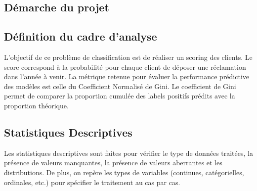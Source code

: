 \documentclass[french]{article}
\begin{document}
\begin{multicols}{2}
\section{Démarche du projet}

\subsection{Définition du cadre d'analyse}

L'objectif de ce problème de classification est de réaliser un scoring des clients. Le score correspond à la probabilité pour chaque client de déposer une réclamation dans l'année à venir. La métrique retenue pour évaluer la performance prédictive des modèles est celle du Coefficient Normalisé de Gini. Le coefficient de Gini permet de comparer la proportion cumulée des labels positifs prédits avec la proportion théorique. 






\subsection{Statistiques Descriptives}

Les statistiques descriptives sont faites pour vérifier le type de données traitées, la présence de valeurs manquantes, la présence de valeurs aberrantes et les distributions. De plus, on repère les types de variables (continues, catégorielles, ordinales, etc.) pour spécifier le traitement au cas par cas.


\end{multicols}
\end{document}
